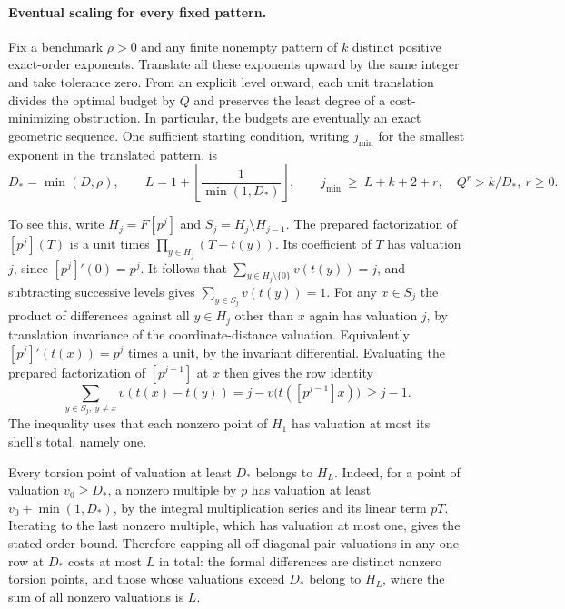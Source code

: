 \paragraph{Eventual scaling for every fixed pattern.}
Fix a benchmark $\rho>0$ and any finite nonempty pattern of $k$ distinct positive exact-order exponents. Translate all these exponents upward by the same integer and take tolerance zero. From an explicit level onward, each unit translation divides the optimal budget by $Q$ and preserves the least degree of a cost-minimizing obstruction. In particular, the budgets are eventually an exact geometric sequence. One sufficient starting condition, writing $j_{\min}$ for the smallest exponent in the translated pattern, is
\[
 D_* = \min(D,\rho),\qquad
 L=1+\left\lfloor\frac{1}{\min(1,D_*)}\right\rfloor,\qquad
 j_{\min}\ \ge\ L+k+2+r,\quad Q^r>k/D_*,\ r\ge0.
\]

To see this, write $H_j=F[p^j]$ and $S_j=H_j\setminus H_{j-1}$. The prepared factorization of $[p^j](T)$ is a unit times $\prod_{y\in H_j}(T-t(y))$. Its coefficient of $T$ has valuation $j$, since $[p^j]'(0)=p^j$. It follows that $\sum_{y\in H_j\setminus\{0\}}v(t(y))=j$, and subtracting successive levels gives $\sum_{y\in S_j}v(t(y))=1$. For any $x\in S_j$ the product of differences against all $y\in H_j$ other than $x$ again has valuation $j$, by translation invariance of the coordinate-distance valuation. Equivalently $[p^j]'(t(x))=p^j$ times a unit, by the invariant differential. Evaluating the prepared factorization of $[p^{j-1}]$ at $x$ then gives the row identity
\[
 \sum_{y\in S_j,\ y\ne x}v(t(x)-t(y))
       =j-v\bigl(t([p^{j-1}]x)\bigr)\ \ge j-1 .
\]
The inequality uses that each nonzero point of $H_1$ has valuation at most its shell's total, namely one.

Every torsion point of valuation at least $D_*$ belongs to $H_L$. Indeed, for a point of valuation $v_0\ge D_*$, a nonzero multiple by $p$ has valuation at least $v_0+\min(1,D_*)$, by the integral multiplication series and its linear term $pT$. Iterating to the last nonzero multiple, which has valuation at most one, gives the stated order bound. Therefore capping all off-diagonal pair valuations in any one row at $D_*$ costs at most $L$ in total: the formal differences are distinct nonzero torsion points, and those whose valuations exceed $D_*$ belong to $H_L$, where the sum of all nonzero valuations is $L$.

